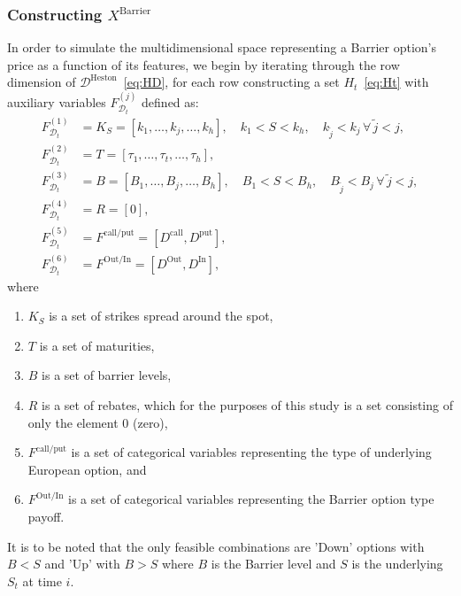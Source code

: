 \documentclass[11pt]{article}
\newcommand{\D}{\mathcal{D}}
\begin{document}
		\subsubsection{Constructing $X^{\text{Barrier}}$}
			In order to simulate the multidimensional space representing a Barrier option's price as a function of its features, we begin by iterating through the row dimension of $\D^{\text{Heston}}$~\eqref{eq:HD}, for each row constructing a set $H_{t}$~\eqref{eq:Ht} with auxiliary variables $F_{\D_{t}}^{(j)}$ defined as:
			\begin{equation}
				\begin{aligned}
					F_{\D_{t}}^{(1)} &= K_{S} = \left[ k_1, \ldots, k_j, \ldots, k_h \right], \quad  k_1 < S < k_h, \quad k_{\tilde{j}} < k_j \, \forall \, \tilde{j} < j, \\
					F_{\D_{t}}^{(2)} &= T = \left[ \tau_1, \ldots, \tau_{t}, \ldots, \tau_h \right], \\
					F_{\D_{t}}^{(3)} &= B = \left[ B_1, \ldots, B_j, \ldots, B_h \right], \quad  B_1 < S < B_h, \quad B_{\tilde{j}} < B_j \, \forall \, \tilde{j} < j, \\
					F_{\D_{t}}^{(4)} &= R = \left[0\right], \\
					F_{\D_{t}}^{(5)} &= F^{\text{call/put}} = \left[ D^{\text{call}}, D^{\text{put}} \right], \\
					F_{\D_{t}}^{(6)} &= F^{\text{Out/In}} = \left[D^{\text{Out}}, D^{\text{In}}\right],
				\end{aligned}
			\end{equation}
			where
			\begin{enumerate}
				\item $K_{S}$ is a set of strikes spread around the spot,
				\item $T$ is a set of maturities,
				\item $B$ is a set of barrier levels,
				\item $R$ is a set of rebates, which for the purposes of this study is a set consisting of only the element $0$ (zero),
				\item $F^{\text{call/put}}$ is a set of categorical variables representing the type of underlying European option, and
				\item $F^{\text{Out/In}}$ is a set of categorical variables representing the Barrier option type payoff.
			\end{enumerate}
			It is to be noted that the only feasible combinations are 'Down' options with $B<S$ and 'Up' with $B>S$ where $B$ is the Barrier level and $S$ is the underlying $S_{t}$ at time $i$.
\end{document}
